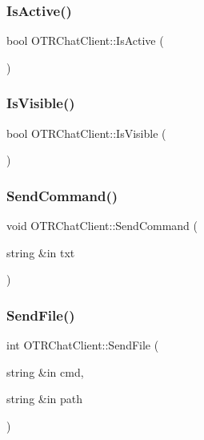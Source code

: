 \subsubsection{\texorpdfstring{Is\+Active()}{IsActive()}}
{\footnotesize\ttfamily bool O\+T\+R\+Chat\+Client\+::\+Is\+Active (\begin{DoxyParamCaption}{ }\end{DoxyParamCaption})}

\hypertarget{class_o_t_r_chat_client_ac59d53b04722e89834e262138e783cc0}{}\label{class_o_t_r_chat_client_ac59d53b04722e89834e262138e783cc0} 
\subsubsection{\texorpdfstring{Is\+Visible()}{IsVisible()}}
{\footnotesize\ttfamily bool O\+T\+R\+Chat\+Client\+::\+Is\+Visible (\begin{DoxyParamCaption}{ }\end{DoxyParamCaption})}

\hypertarget{class_o_t_r_chat_client_a01aaabbd16903730f77c0d975dc7bc98}{}\label{class_o_t_r_chat_client_a01aaabbd16903730f77c0d975dc7bc98} 
\subsubsection{\texorpdfstring{Send\+Command()}{SendCommand()}}
{\footnotesize\ttfamily void O\+T\+R\+Chat\+Client\+::\+Send\+Command (\begin{DoxyParamCaption}\item[{string \&in}]{txt }\end{DoxyParamCaption})}

\hypertarget{class_o_t_r_chat_client_afff6756f1aeb6947fa3359b9bde2501c}{}\label{class_o_t_r_chat_client_afff6756f1aeb6947fa3359b9bde2501c} 
\subsubsection{\texorpdfstring{Send\+File()}{SendFile()}}
{\footnotesize\ttfamily int O\+T\+R\+Chat\+Client\+::\+Send\+File (\begin{DoxyParamCaption}\item[{string \&in}]{cmd,  }\item[{string \&in}]{path }\end{DoxyParamCaption})}

